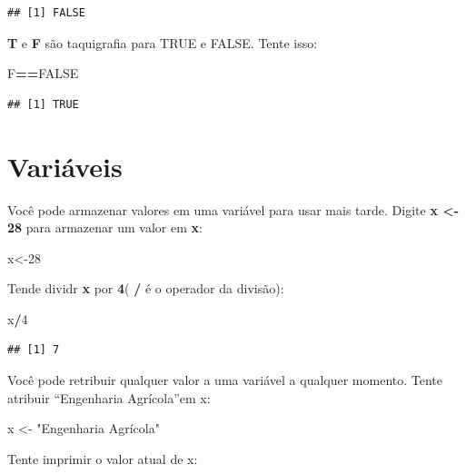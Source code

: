 \documentclass[
]{book}
\newenvironment{Shaded}{\begin{snugshade}}{\end{snugshade}}
\newcommand{\DecValTok}[1]{\textcolor[rgb]{0.00,0.00,0.81}{#1}}
\newcommand{\NormalTok}[1]{#1}
\newcommand{\OperatorTok}[1]{\textcolor[rgb]{0.81,0.36,0.00}{\textbf{#1}}}
\newcommand{\OtherTok}[1]{\textcolor[rgb]{0.56,0.35,0.01}{#1}}
\newcommand{\StringTok}[1]{\textcolor[rgb]{0.31,0.60,0.02}{#1}}
\begin{document}
\begin{verbatim}
## [1] FALSE
\end{verbatim}

\textbf{T} e \textbf{F} são taquigrafia para TRUE e FALSE. Tente isso:

\begin{Shaded}
\begin{Highlighting}[]
\NormalTok{F}\OperatorTok{==}\OtherTok{FALSE}
\end{Highlighting}
\end{Shaded}

\begin{verbatim}
## [1] TRUE
\end{verbatim}

\hypertarget{variuxe1veis}{%
\section{Variáveis}\label{variuxe1veis}}

Você pode armazenar valores em uma variável para usar mais tarde.
Digite \textbf{x \textless- 28} para armazenar um valor em \textbf{x}:

\begin{Shaded}
\begin{Highlighting}[]
\NormalTok{x<-}\DecValTok{28}
\end{Highlighting}
\end{Shaded}

Tende dividr \textbf{x} por \textbf{4}( \textbf{/} é o operador da divisão):

\begin{Shaded}
\begin{Highlighting}[]
\NormalTok{x}\OperatorTok{/}\DecValTok{4}
\end{Highlighting}
\end{Shaded}

\begin{verbatim}
## [1] 7
\end{verbatim}

Você pode retribuir qualquer valor a uma variável a qualquer momento.
Tente atribuir ``Engenharia Agrícola''em x:

\begin{Shaded}
\begin{Highlighting}[]
\NormalTok{x <-}\StringTok{ "Engenharia Agrícola"}
\end{Highlighting}
\end{Shaded}

Tente imprimir o valor atual de x:
\end{document}
